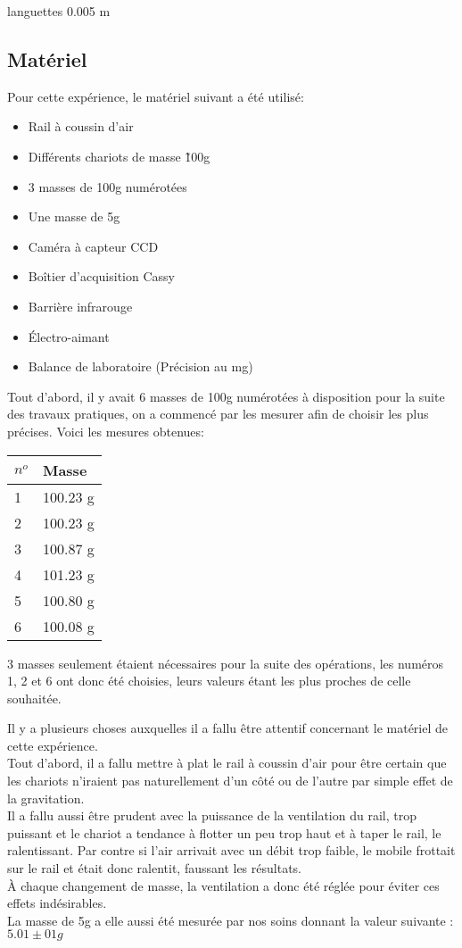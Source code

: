 languettes 0.005 m
\subsection{Matériel}
Pour cette expérience, le matériel suivant a été utilisé:
\begin{itemize}
    \item Rail à coussin d'air
    \item Différents chariots de masse \~100g
    \item 3 masses de 100g numérotées
    \item Une masse de 5g
    \item Caméra à capteur CCD
    \item Boîtier d'acquisition Cassy
    \item Barrière infrarouge
    \item Électro-aimant
    \item Balance de laboratoire (Précision au mg)
\end{itemize}


Tout d'abord, il y avait 6 masses de 100g numérotées à disposition pour la suite des travaux pratiques, on a commencé par les mesurer afin de choisir les plus précises. Voici les mesures obtenues:
\begin{table}[h]
    \centering
    \begin{tabular}{|l|l|}
	\hline
	$n^o$ & Masse \\
	\hline
	1 & 100.23 g \\
	2 & 100.23 g \\
	3 & 100.87 g \\
	4 & 101.23 g \\
	5 & 100.80 g \\
	6 & 100.08 g \\
	\hline
    \end{tabular}
\end{table}
3 masses seulement étaient nécessaires pour la suite des opérations, les numéros 1, 2 et 6 ont donc été choisies, leurs valeurs étant les plus proches de celle souhaitée.

Il y a plusieurs choses auxquelles il a fallu être attentif concernant le matériel de cette expérience.\\
Tout d'abord, il a fallu mettre à plat le rail à coussin d'air pour être certain que les chariots n'iraient pas naturellement d'un côté ou de l'autre par simple effet de la gravitation.\\
Il a fallu aussi être prudent avec la puissance de la ventilation du rail, trop puissant et le chariot a tendance à flotter un peu trop haut et à taper le rail, le ralentissant. Par contre si l'air arrivait avec un débit trop faible, le mobile frottait sur le rail et était donc ralentit, faussant les résultats.\\
À chaque changement de masse, la ventilation a donc été réglée pour éviter ces effets indésirables.\\
La masse de 5g a elle aussi été mesurée par nos soins donnant la valeur suivante : $5.01 \pm 01g$

